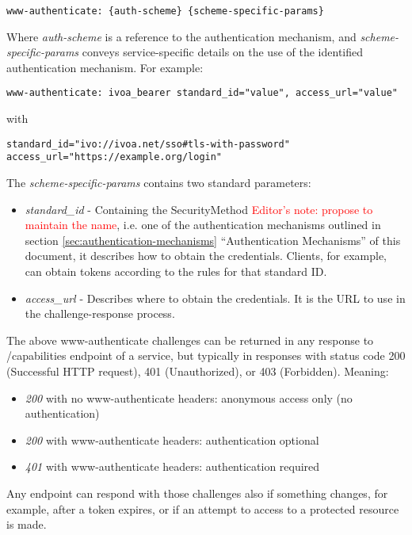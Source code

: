 \documentclass[11pt,a4paper]{ivoa}
\begin{document}
\begin{verbatim}
www-authenticate: {auth-scheme} {scheme-specific-params}
\end{verbatim}

Where \emph{auth-scheme} is a reference to the authentication mechanism,
and \emph{scheme-specific-params} conveys service-specific details on
the use of the identified authentication mechanism. For example:
\begin{verbatim}
www-authenticate: ivoa_bearer standard_id="value", access_url="value"
\end{verbatim}
with
\begin{verbatim}
standard_id="ivo://ivoa.net/sso#tls-with-password"
access_url="https://example.org/login"
\end{verbatim}
The \emph{scheme-specific-params} contains two standard
parameters:
\begin{itemize}
\item{\emph{standard\_id}} - Containing the SecurityMethod 
\textcolor{red}{Editor's note: 
propose to maintain the name}, i.e. one of the authentication mechanisms 
outlined in section \ref{sec:authentication-mechanisms} 
``Authentication Mechanisms'' of this document, it describes how to 
obtain the credentials. Clients, for example, can obtain tokens 
according to the rules for that standard ID.
\item{\emph{access\_url}} - Describes where to obtain the credentials.
It is the URL to use in the challenge-response process.
\end{itemize}

The above www-authenticate challenges can be returned in any response 
to /capabilities endpoint of a service, but 
typically in responses with status code 200 (Successful HTTP request), 401 
(Unauthorized), or 403 (Forbidden). Meaning:

\begin{itemize}
\item{\emph{200}} with no www-authenticate headers: anonymous access only 
(no authentication)
\item{\emph{200}} with www-authenticate headers: authentication optional
\item{\emph{401}} with www-authenticate headers: authentication required
\end{itemize}

Any endpoint can respond with those challenges also
if something changes, for example, after a token expires, or if an 
attempt to  access to a protected resource is made.
\end{document}
